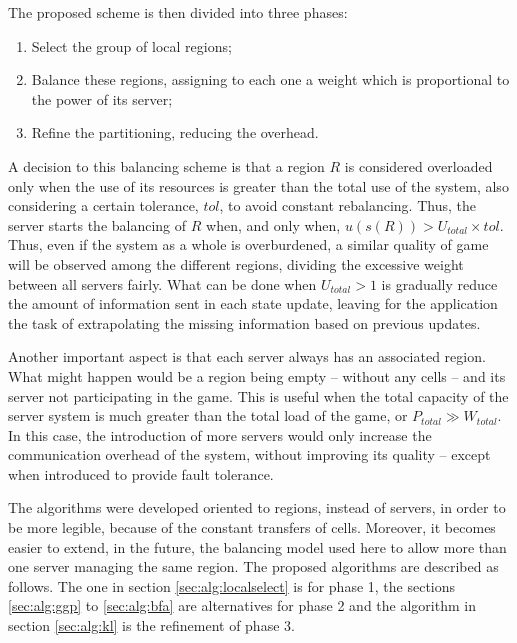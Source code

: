 The proposed scheme is then divided into three phases:

\begin{enumerate}
	\item Select the group of local regions;
	\item Balance these regions, assigning to each one a weight which is proportional to the power of its server;
	\item Refine the partitioning, reducing the overhead.
\end{enumerate}

A decision to this balancing scheme is that a region $R$ is considered overloaded only when the use of its resources is greater than the total use of the system, also considering a certain tolerance, $tol$, to avoid constant rebalancing. Thus, the server starts the balancing of $R$ when, and only when, $u(s(R)) > U_{total} \times tol$. Thus, even if the system as a whole is overburdened, a similar quality of game will be observed among the different regions, dividing the excessive weight between all servers fairly. What can be done when $U_{total} > 1$ is gradually reduce the amount of information sent in each state update, leaving for the application the task of extrapolating the missing information based on previous updates.

Another important aspect is that each server always has an associated region. What might happen would be a region being empty -- without any cells -- and its server not participating in the game. This is useful when the total capacity of the server system is much greater than the total load of the game, or $ P_{total} \gg W_{total}$. In this case, the introduction of more servers would only increase the communication overhead of the system, without improving its quality -- except when introduced to provide fault tolerance.

The algorithms were developed oriented to regions, instead of servers, in order to be more legible, because of the constant transfers of cells. Moreover, it becomes easier to extend, in the future, the balancing model used here to allow more than one server managing the same region. The proposed algorithms are described as follows. The one in section \ref{sec:alg:localselect} is for phase 1, the sections \ref{sec:alg:ggp} to \ref{sec:alg:bfa} are alternatives for phase 2 and the algorithm in section \ref{sec:alg:kl} is the refinement of phase 3.

